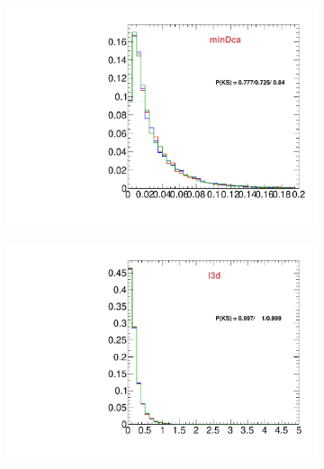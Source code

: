 \begin{figure}
\begin{subfigure}[b]{0.2\textwidth}
                \includegraphics[width=\textwidth]{Figures/VariablesComparison/MC_barrel_figs_3h/minDca}
                \label{fig:MC_barrel_minDca_3h}
        \end{subfigure}
        \begin{subfigure}[b]{0.2\textwidth}
                \centering
                \includegraphics[width=\textwidth]{Figures/VariablesComparison/MC_barrel_figs_3h/l3d}
                \label{fig:MC_barrel_l3d_3h}
        \end{subfigure}
        \begin{subfigure}[b]{0.2\textwidth}
                \centering

\end{subfigure}
\end{figure}
